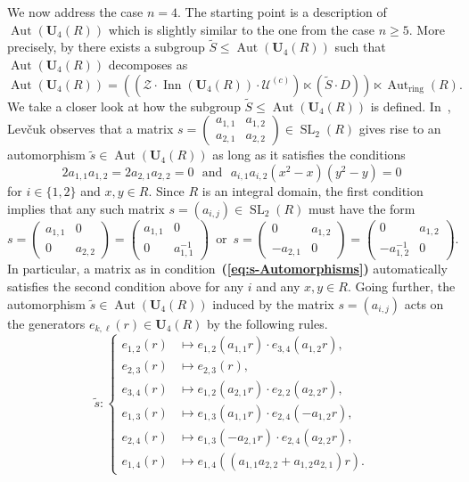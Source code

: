 \documentclass[a4paper,11pt]{amsart}
\numberwithin{equation}{section}
\theoremstyle{plain}
\theoremstyle{definition}
\newcommand{\anel}[1]{#1_{\text{ring}}} %
\DeclareMathOperator{\SL}{SL} %
\newcommand{\mbU}{\mathbf{U}} %
\newcommand{\mc}{\mathcal}
\newcommand{\bref}[1]{{\bf(\ref{#1})}} %
\DeclareMathOperator{\Aut}{Aut}
\DeclareMathOperator{\Inn}{Inn}
\begin{document}
We now address the case $n = 4$. The starting point is a description of $\Aut(\mbU_4(R))$ which is slightly similar to the one from the case $n \geq 5$. 
More precisely, by \cite[Theorem~2]{LevchukOriginal} there exists a subgroup $\widetilde{S} \leq \Aut(\mbU_4(R))$ such that $\Aut(\mbU_4(R))$ decomposes as 
\[ \Aut(\mbU_4(R)) = ((\mc{Z} \cdot \Inn(\mbU_4(R)) \cdot \mc{U}^{(c)}) \ltimes (\widetilde{S} \cdot D)) \ltimes \anel{\Aut}(R).\] 
We take a closer look at how the subgroup $\widetilde{S} \leq \Aut(\mbU_4(R))$ is defined. 
In~\cite[pp.~73 and~74]{LevchukOriginal}, Lev\v{c}uk observes that a matrix $s = \left( \begin{smallmatrix} a_{1,1} & a_{1,2} \\ a_{2,1} & a_{2,2} \end{smallmatrix} \right) \in \SL_2(R)$ gives rise to an automorphism $\widetilde{s} \in \Aut(\mbU_4(R))$ as long as it satisfies the conditions 
\[ 2a_{1,1}a_{1,2} = 2a_{2,1}a_{2,2} = 0 \, \, \text{ and } \, \, a_{i,1}a_{i,2}(x^2-x)(y^2-y)=0 \]
for $i\in\{1,2\}$ and $x,y\in R$. Since $R$ is an integral domain, the first condition implies that any such matrix $s = (a_{i,j}) \in \SL_2(R)$ must have the form
\begin{equation} \label{eq:s-Automorphisms}
s = \left( \begin{smallmatrix} a_{1,1} & 0 \\ 0 & a_{2,2} \end{smallmatrix} \right) = \left( \begin{smallmatrix} a_{1,1} & 0 \\ 0 & a_{1,1}^{-1} \end{smallmatrix} \right)  \, \text{ or } \, s = \left( \begin{smallmatrix} 0 & a_{1,2} \\ -a_{2,1} & 0 \end{smallmatrix} \right) = \left( \begin{smallmatrix} 0 & a_{1,2} \\ -a_{1,2}^{-1} & 0 \end{smallmatrix} \right).
\end{equation}
In particular, a matrix as in condition~\bref{eq:s-Automorphisms} automatically satisfies the second condition above for any $i$ and any $x,y \in R$. Going further, the automorphism $\widetilde{s} \in \Aut(\mbU_4(R))$ induced by the matrix $s = (a_{i,j})$ acts on the generators $e_{k,\ell}(r) \in \mbU_4(R)$ by the following rules. 
\[
\widetilde{s} : 
\begin{cases} e_{1,2}(r) & \mapsto e_{1,2}(a_{1,1}r) \cdot e_{3,4}(a_{1,2}r), \\ 
e_{2,3}(r) & \mapsto e_{2,3}(r), \\ 
e_{3,4}(r) & \mapsto e_{1,2}(a_{2,1}r) \cdot e_{2,2}(a_{2,2}r), \\
e_{1,3}(r) & \mapsto e_{1,3}(a_{1,1}r) \cdot e_{2,4}(-a_{1,2}r), \\
e_{2,4}(r) & \mapsto e_{1,3}(-a_{2,1}r) \cdot e_{2,4}(a_{2,2}r), \\
e_{1,4}(r) & \mapsto e_{1,4}((a_{1,1}a_{2,2}+a_{1,2}a_{2,1})r).
\end{cases}
\]
\end{document}
